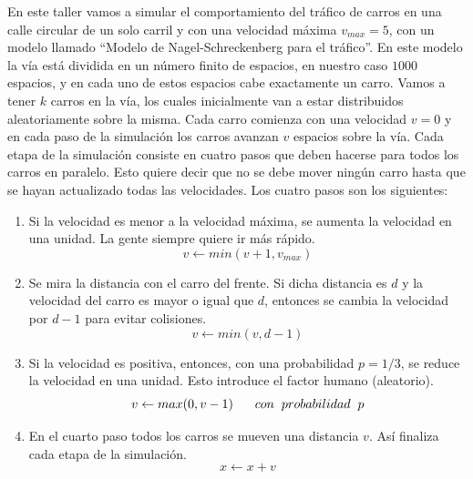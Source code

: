 \documentclass[11pt,letterpaper]{exam}
\begin{document}
\begin{questions}

\question[100] En este taller vamos a simular el comportamiento del tráfico de carros en una calle circular de un solo carril y con una velocidad máxima $v_{max} = 5$, con un modelo llamado ``Modelo de Nagel-Schreckenberg para el tráfico''. En este modelo la vía está dividida en un número finito de espacios, en nuestro caso $1000$ espacios, y en cada uno de estos espacios cabe exactamente un carro. Vamos a tener $k$ carros en la vía, los cuales inicialmente van a estar distribuidos aleatoriamente sobre la misma. Cada carro comienza con una velocidad $v = 0$ y en cada paso de la simulación los carros avanzan $v$ espacios sobre la vía. Cada etapa de la simulación consiste en cuatro pasos que deben hacerse para todos los carros en paralelo. Esto quiere decir que no se debe mover ningún carro hasta que se hayan actualizado todas las velocidades. Los cuatro pasos son los siguientes: 

\begin{enumerate}
\item Si la velocidad es menor a la velocidad máxima, se aumenta la velocidad en una unidad. La gente siempre quiere ir más rápido. 
\begin{equation}
v \leftarrow min(v+1,v_{max})
\end{equation}
\item Se mira la distancia con el carro del frente. Si dicha distancia es $d$ y la velocidad del carro es mayor o igual que $d$, entonces se cambia la velocidad por $d-1$ para evitar colisiones. 
\begin{equation}
v \leftarrow min(v,d-1)
\end{equation}
\item Si la velocidad es positiva, entonces, con una probabilidad $p=1/3$, se reduce la velocidad en una unidad. Esto introduce el factor humano (aleatorio).
\begin{equation}
v \leftarrow max(0,v-1) \hspace{0.6cm} con \hspace{0.2cm} probabilidad \hspace{0.2cm} p
\end{equation}
\item En el cuarto paso todos los carros se mueven una distancia $v$. Así finaliza cada etapa de la simulación. 
\begin{equation}
x \leftarrow x+v
\end{equation}
\end{enumerate}


\end{questions}
\end{document}
